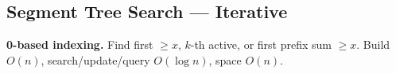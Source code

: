\documentclass[9pt,a4paper]{extarticle}
\begin{document}
\newcommand{\searchhead}[1]{%
  \par\vspace{5pt}\noindent
  {\bfseries\fontsize{10.1}{12.22}\selectfont #1}%
  \par\vspace{1pt}\hrule\vspace{3pt}
}
\newcommand{\searchcode}[1]{%
  {\ttfamily\fontsize{7.95}{9.32}\selectfont\detokenize{#1}}%
}
\newcommand{\searchpattern}[3]{%
  {\bfseries #1}\par
  {\fontsize{9.2}{10.72}\selectfont
  \textbf{Problem:} #2\par
  \textbf{Approach:} #3\par}\vspace{3pt}
}

\subsection{Segment Tree Search --- Iterative}
\vspace{2pt}
{\small\textbf{0-based indexing.}
Find first $\ge x$, $k$-th active, or first prefix sum $\ge x$.
Build $O(n)$, search/update/query $O(\log n)$, space $O(n)$.}
\par\vspace{4pt}
\noindent

\end{document}
